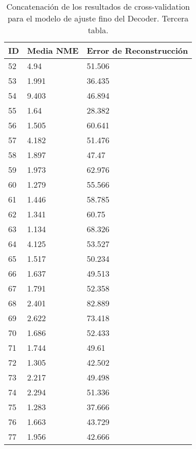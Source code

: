 \begin{table}[!ht]
    \centering
    \caption{Concatenación de los resultados de cross-validation para el modelo de ajuste fino del Decoder. Tercera tabla.}
    \begin{tabular}{|l|l|l|}
    \hline
    \cellcolor{gray!25}\textbf{ID} & \cellcolor{gray!25}\textbf{Media NME} & \cellcolor{gray!25}\textbf{Error de Reconstrucción} \\ \hline
        52 & 4.94 & 51.506 \\ \hline
        53 & 1.991 & 36.435 \\ \hline
        54 & 9.403 & 46.894 \\ \hline
        55 & 1.64 & 28.382 \\ \hline
        56 & 1.505 & 60.641 \\ \hline
        57 & 4.182 & 51.476 \\ \hline
        58 & 1.897 & 47.47 \\ \hline
        59 & 1.973 & 62.976 \\ \hline
        60 & 1.279 & 55.566 \\ \hline
        61 & 1.446 & 58.785 \\ \hline
        62 & 1.341 & 60.75 \\ \hline
        63 & 1.134 & 68.326 \\ \hline
        64 & 4.125 & 53.527 \\ \hline
        65 & 1.517 & 50.234 \\ \hline
        66 & 1.637 & 49.513 \\ \hline
        67 & 1.791 & 52.358 \\ \hline
        68 & 2.401 & 82.889 \\ \hline
        69 & 2.622 & 73.418 \\ \hline
        70 & 1.686 & 52.433 \\ \hline
        71 & 1.744 & 49.61 \\ \hline
        72 & 1.305 & 42.502 \\ \hline
        73 & 2.217 & 49.498 \\ \hline
        74 & 2.294 & 51.336 \\ \hline
        75 & 1.283 & 37.666 \\ \hline
        76 & 1.663 & 43.729 \\ \hline
        77 & 1.956 & 42.666 \\ \hline
    \end{tabular}
\end{table}

